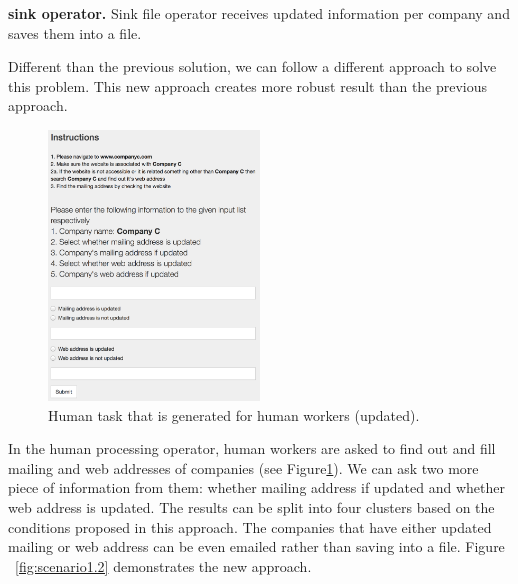 
\textbf{sink operator.}
Sink file operator receives updated information per company and saves them into a file.



Different than the previous solution, we can follow a different approach to solve this problem. This new approach creates more robust result than the previous approach.

\begin{figure}[ht]
	\centering
	\includegraphics[width=0.5\textwidth]{figures/scenarios/scenario1_2h.png}
	\caption{Human task that is generated for human workers (updated).}
	\label{fig:scenario1.2h}
\end{figure}

In the human processing operator, human workers are asked to find out and fill mailing and web addresses of companies (see Figure\ref{fig:scenario1.2h}). We can ask two more piece of information from them: whether mailing address if updated and whether web address is updated. The results can be split into four clusters based on the conditions proposed in this approach. The companies that have either updated mailing or web address can be even emailed rather than saving into a file. Figure ~\ref{fig:scenario1.2} demonstrates the new approach.

